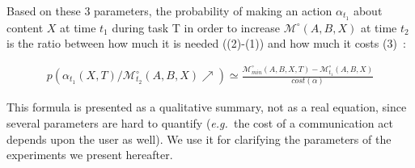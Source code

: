 \documentclass[natbib]{svjour3}
\newcommand{\eg}{{\textit{e.g.\ }}}
\newcommand{\Model}[3]{{$\mathcal{M}^{\circ}(#1, #2, #3)$}}
\begin{document}
Based on these 3 parameters, the probability of making an action $\alpha_{t_1}$ about
content $X$ at time $t_1$ during task T in order to increase \Model{A}{B}{X}
at time $t_2$ is the ratio between how much it is needed  ((2)-(1)) and how much it
costs (3)~\citep{traum1996miscommunication}:

\begin{multline} \label{eq:probrepair}
    p(\alpha_{t_1}(X,T) / \mathcal{M}^{\circ}_{t_2}(A,B,X) \nearrow) \simeq
    \frac{\mathcal{M}^{\circ}_{min}(A,B,X,T) - \mathcal{M}^{\circ}_{t_1}(A,B,X)}{cost (\alpha)}
\end{multline}

This formula is presented as a qualitative summary, not as a real equation, since several parameters
are hard to quantify (\eg the cost of a communication act depends upon the user
as well). We use it for clarifying the parameters of the experiments we present hereafter.
\end{document}
